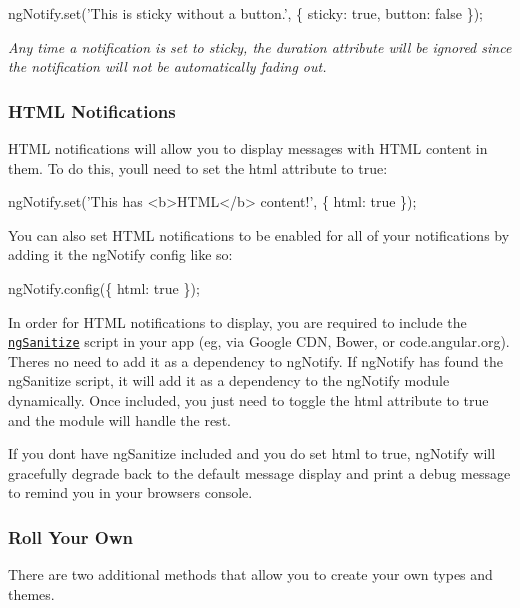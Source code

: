 \begin{DoxyCode}
ngNotify.set('This is sticky without a button.', \{
    sticky: true,
    button: false
\});
\end{DoxyCode}


{\itshape Any time a notification is set to sticky, the duration attribute will be ignored since the notification will not be automatically fading out.}

\subsubsection*{H\+T\+ML Notifications}

H\+T\+ML notifications will allow you to display messages with H\+T\+ML content in them. To do this, you\textquotesingle{}ll need to set the {\ttfamily html} attribute to true\+:


\begin{DoxyCode}
ngNotify.set('This has <b>HTML</b> content!', \{
    html: true
\});
\end{DoxyCode}


You can also set H\+T\+ML notifications to be enabled for all of your notifications by adding it the ng\+Notify config like so\+:


\begin{DoxyCode}
ngNotify.config(\{
    html: true
\});
\end{DoxyCode}
 In order for H\+T\+ML notifications to display, you are required to include the \href{https://docs.angularjs.org/api/ngSanitize}{\tt ng\+Sanitize} script in your app (eg, via Google C\+DN, Bower, or code.\+angular.\+org). There\textquotesingle{}s no need to add it as a dependency to ng\+Notify. If ng\+Notify has found the ng\+Sanitize script, it will add it as a dependency to the ng\+Notify module dynamically. Once included, you just need to toggle the {\ttfamily html} attribute to true and the module will handle the rest.

If you don\textquotesingle{}t have ng\+Sanitize included and you do set {\ttfamily html} to true, ng\+Notify will gracefully degrade back to the default message display and print a debug message to remind you in your browser\textquotesingle{}s console.

\subsubsection*{Roll Your Own}

There are two additional methods that allow you to create your own types and themes.

